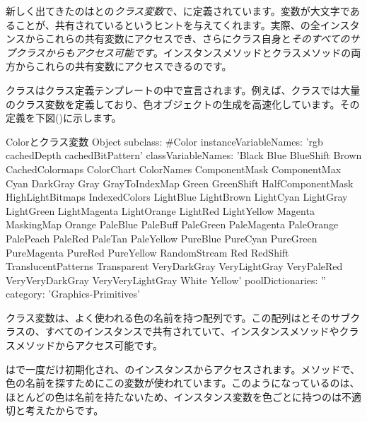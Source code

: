 \documentclass[a4paper,10pt,twoside]{book}
\begin{document}
新しく出てきたのはとの\emph{クラス変数}で、に定義されています。変数が大文字であることが、共有されているというヒントを与えてくれます。実際、の全インスタンスからこれらの共有変数にアクセスでき、さらにクラス自身と\emph{そのすべてのサブクラスからもアクセス可能です}。インスタンスメソッドとクラスメソッドの両方からこれらの共有変数にアクセスできるのです。


クラスはクラス定義テンプレートの中で宣言されます。例えば、クラスでは大量のクラス変数を定義しており、色オブジェクトの生成を高速化しています。その定義を下図()に示します。
\begin{classdef}[Color]{Colorとクラス変数}
Object subclass: #Color 	
        instanceVariableNames: 'rgb cachedDepth cachedBitPattern'
        classVariableNames: 'Black Blue BlueShift Brown CachedColormaps ColorChart ColorNames ComponentMask ComponentMax Cyan DarkGray Gray GrayToIndexMap Green GreenShift HalfComponentMask HighLightBitmaps IndexedColors LightBlue LightBrown LightCyan LightGray LightGreen LightMagenta LightOrange LightRed LightYellow Magenta MaskingMap Orange PaleBlue PaleBuff PaleGreen PaleMagenta PaleOrange PalePeach PaleRed PaleTan PaleYellow PureBlue PureCyan PureGreen PureMagenta PureRed PureYellow RandomStream Red RedShift TranslucentPatterns Transparent VeryDarkGray VeryLightGray VeryPaleRed VeryVeryDarkGray VeryVeryLightGray White Yellow'
        poolDictionaries: '' 	
        category: 'Graphics-Primitives'
\end{classdef}

クラス変数は、よく使われる色の名前を持つ配列です。この配列はとそのサブクラスの、すべてのインスタンスで共有されていて、インスタンスメソッドやクラスメソッドからアクセス可能です。%

はで一度だけ初期化され、のインスタンスからアクセスされます。メソッドで、色の名前を探すためにこの変数が使われています。このようになっているのは、ほとんどの色は名前を持たないため、インスタンス変数を色ごとに持つのは不適切と考えたからです。
\end{document}
